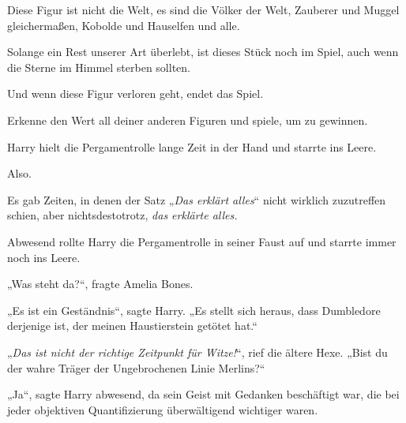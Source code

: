 \begin{writtenNote}
Diese Figur ist nicht die Welt, es sind die Völker der Welt, Zauberer und Muggel gleichermaßen, Kobolde und Hauselfen und alle.

Solange ein Rest unserer Art überlebt, ist dieses Stück noch im Spiel, auch wenn die Sterne im Himmel sterben sollten.

Und wenn diese Figur verloren geht, endet das Spiel.

Erkenne den Wert all deiner anderen Figuren und spiele, um zu gewinnen.

\end{writtenNote}

\later

Harry hielt die Pergamentrolle lange Zeit in der Hand und starrte ins Leere.

Also.

Es gab Zeiten, in denen der Satz „\emph{Das erklärt alles}“ nicht wirklich zuzutreffen schien, aber nichtsdestotrotz, \emph{das erklärte alles.}

Abwesend rollte Harry die Pergamentrolle in seiner Faust auf und starrte immer noch ins Leere.

„Was steht da?“, fragte Amelia Bones.

„Es ist ein Geständnis“, sagte Harry. „Es stellt sich heraus, dass Dumbledore derjenige ist, der meinen Haustierstein getötet hat.“

„\emph{Das ist nicht der richtige Zeitpunkt für Witze!}“, rief die ältere Hexe. „Bist du der wahre Träger der Ungebrochenen Linie Merlins?“

„Ja“, sagte Harry abwesend, da sein Geist mit Gedanken beschäftigt war, die bei jeder objektiven Quantifizierung überwältigend wichtiger waren.

